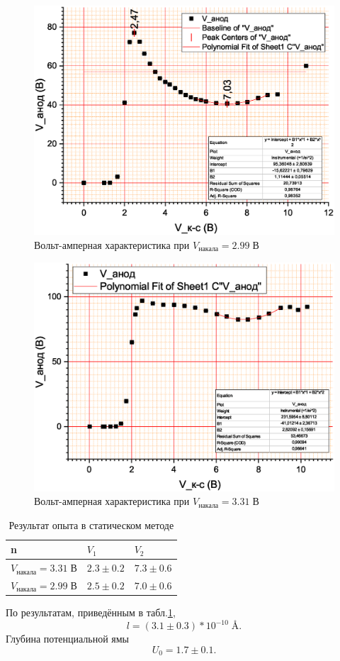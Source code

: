 \documentclass[a4paper]{article}
\begin{document}
\begin{figure}
	\centering
	\includegraphics[width=1.0\linewidth]{V1}
	\caption{Вольт-амперная характеристика при $V_{накала} = 2.99 \; В$}
	\label{fig:v--2}
\end{figure}


\begin{figure}
	\centering
	\includegraphics[width=1.0\linewidth]{V2}
	\caption{Вольт-амперная характеристика при $V_{накала} = 3.31 \; В$}
	\label{fig:v--3}
\end{figure}

\begin{table}[]
	\centering
	\begin{tabular}{|l|l|l|}
		\hline
		n                       & $V_1$        & $V_2$        \\ \hline
		$V_{накала} = 3.31\; В$ & $2.3\pm 0.2$ & $7.3\pm 0.6$ \\ \hline
		$V_{накала} = 2.99\; В$ & $2.5\pm 0.2$ & $7.0\pm 0.6$ \\ \hline
	\end{tabular}
	\caption{Результат опыта в статическом методе}
	\label{tab:stat}
\end{table}
По результатам, приведённым в табл.\ref{tab:stat},
\[
	l = (3.1 \pm 0.3)*10^{-10} \; \text{\AA{}}.
\]
Глубина потенциальной ямы
\[
	U_0 = 1.7\pm 0.1.
\]
\end{document}
